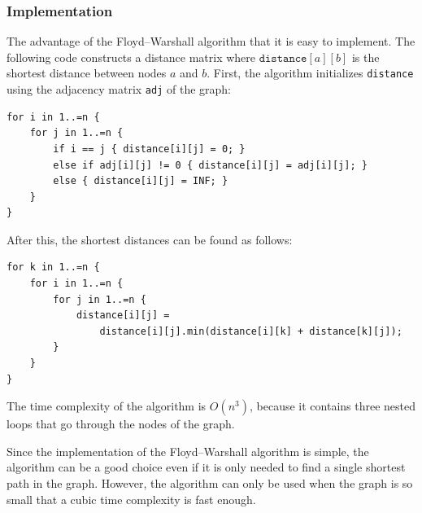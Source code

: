 \subsubsection{Implementation}

The advantage of the
Floyd–Warshall algorithm that it is
easy to implement.
The following code constructs a
distance matrix where $\texttt{distance}[a][b]$
is the shortest distance between nodes $a$ and $b$.
First, the algorithm initializes \texttt{distance}
using the adjacency matrix \texttt{adj} of the graph:

\begin{lstlisting}
for i in 1..=n {
    for j in 1..=n {
        if i == j { distance[i][j] = 0; }
        else if adj[i][j] != 0 { distance[i][j] = adj[i][j]; }
        else { distance[i][j] = INF; }
    }
}
\end{lstlisting}
After this, the shortest distances can be found as follows:
\begin{lstlisting}
for k in 1..=n {
    for i in 1..=n {
        for j in 1..=n {
            distance[i][j] =
                distance[i][j].min(distance[i][k] + distance[k][j]);
        }
    }
}
\end{lstlisting}

The time complexity of the algorithm is $O(n^3)$,
because it contains three nested loops
that go through the nodes of the graph.

Since the implementation of the Floyd–Warshall
algorithm is simple, the algorithm can be
a good choice even if it is only needed to find a
single shortest path in the graph.
However, the algorithm can only be used when the graph
is so small that a cubic time complexity is fast enough.
